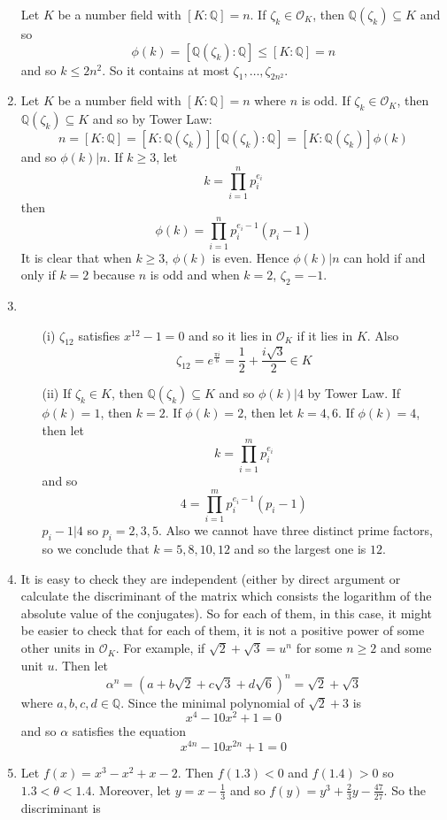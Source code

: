 \begin{enumerate}
    Let $K$ be a number field with $[K:\mathbb{Q}]=n$. If $\zeta_k \in \mathcal{O}_K$, then
    $\mathbb{Q}(\zeta_k) \subseteq K$ and so
    $$\phi(k)=[\mathbb{Q}(\zeta_k):\mathbb{Q}] \le [K:\mathbb{Q}]=n$$
    and so $k \le 2n^2$. So it contains at most $\zeta_1,\ldots,\zeta_{2n^2}$.\\
\item  Let $K$ be a number field with $[K:\mathbb{Q}]=n$ where $n$ is odd. If $\zeta_k \in \mathcal{O}_K$,
    then $\mathbb{Q}(\zeta_k) \subseteq K$ and so by Tower Law:
    $$n=[K:\mathbb{Q}]=[K:\mathbb{Q}(\zeta_k)][\mathbb{Q}(\zeta_k):\mathbb{Q}]=[K:\mathbb{Q}(\zeta_k)]\phi(k)$$
    and so $\phi(k)|n$. If $k \ge 3$, let
    $$k=\prod_{i=1}^n p^{e_i}_i$$ then
    $$\phi(k)=\prod_{i=1}^n p^{e_i-1}_i(p_i-1)$$
    It is clear that when $k \ge 3$, $\phi(k)$ is even. Hence $\phi(k)|n$ can hold if and only if $k=2$ because
    $n$ is odd and when $k=2$, $\zeta_2=-1$.
\item 
\begin{enumerate}
\item[(i)] $\zeta_{12}$ satisfies $x^12-1=0$ and so it lies in $\mathcal{O}_K$ if it lies in $K$. Also
$$\zeta_{12}=e^{\frac{\pi i}{6}}=\frac{1}{2}+\frac{i\sqrt{3}}{2} \in K$$
\item[(ii)] If $\zeta_k \in K$, then $\mathbb{Q}(\zeta_k) \subseteq K$ and so
$\phi(k)|4$ by Tower Law. If $\phi(k)=1$, then $k=2$.
If $\phi(k)=2$, then let $k=4,6$. If $\phi(k)=4$, then let
$$k=\prod_{i=1}^m p^{e_i}_i$$
and so
$$4=\prod_{i=1}^m p^{e_i-1}_i(p_i-1)$$
$p_i-1|4$ so $p_i=2,3,5$. Also we cannot have three distinct prime factors, so we conclude that
$k=5,8,10,12$ and so the largest one is $12$.
\end{enumerate}
\item It is easy to check they are independent (either by direct argument or calculate the discriminant of the 
matrix which consists the logarithm of the absolute value of the conjugates). So for each of them, in this case, it
might be easier to check that for each of them, it is not a positive power of some other units in $\mathcal{O}_K$.
For example, if $\sqrt{2}+\sqrt{3}=u^n$ for some $n \ge 2$ and some unit $u$. Then let
$$\alpha^n=(a+b\sqrt{2}+c\sqrt{3}+d\sqrt{6})^n=\sqrt{2}+\sqrt{3}$$
where $a,b,c,d \in \mathbb{Q}$. Since the minimal polynomial of $\sqrt{2}+3$ is 
$$x^4-10x^2+1=0$$
and so $\alpha$ satisfies the equation
$$x^{4n}-10x^{2n}+1=0$$
\item Let $f(x)=x^3-x^2+x-2$. Then $f(1.3)<0$ and $f(1.4)>0$ so $1.3 < \theta <1.4$. Moreover,
let $y=x-\frac{1}{3}$ and so $f(y)=y^3+\frac{2}{3}y-\frac{47}{27}$. So the discriminant is

\end{enumerate}
